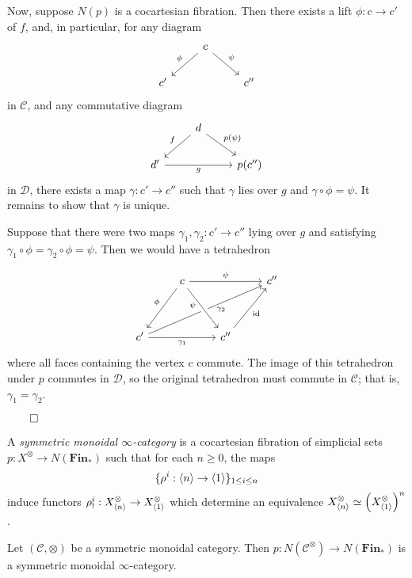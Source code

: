\documentclass{MetricNotes2023}
\def\id{\ensuremath\text{id}}
\def\done{\begin{flushright}\vspace{-4.35ex}\(\qed\)\end{flushright}}
\begin{document}
\begin{ourproof}
Now, suppose \(N(p)\) is a cocartesian fibration. Then there exists a lift \(\phi : c \to c'\) of \(f\), and, in particular, for any diagram
\[\begin{tikzcd}
& c \arrow[dl, swap, "\phi"] \arrow[dr, "\psi"]  & \\
c'  & & c''
\end{tikzcd}\]
in \(\mathcal{C}\), and any commutative diagram
\[\begin{tikzcd}
& d \arrow[dl, swap, "f"] \arrow[dr, "p(\psi)"]  & \\
d' \arrow[rr, swap, "g"] & & p(c'')
\end{tikzcd}\]
in \(\mathcal{D}\), there exists a map \(\gamma : c'\to c''\) such that \(\gamma\) lies over \(g\) and \(\gamma \circ \phi = \psi\). It remains to show that \(\gamma\) is unique. 

Suppose that there were two maps \(\gamma_1, \gamma_2 : c' \to c''\) lying over \(g\) and satisfying \(\gamma_1\circ\phi = \gamma_2 \circ \phi = \psi\). Then we would have a tetrahedron 

\[\begin{tikzcd}
& c \arrow[rr, "\psi"] \arrow[ddl, swap, "\phi"]  & & c'' \\
& & & \\
c' \arrow[rr, swap, "\gamma_1"] \arrow[rrruu, swap, "\gamma_2" {xshift=8pt, yshift=5pt}] & & c'' \arrow[ruu, swap, "\id"] \arrow[from=luu, swap, crossing over, "\psi" {xshift=-4pt, yshift=8pt}] & 
\end{tikzcd}\]
where all faces containing the vertex \(c\) commute. The image of this tetrahedron under \(p\) commutes in \(\mathcal{D}\), so the original tetrahedron must commute in \(\mathcal{C}\); that is, \(\gamma_1=\gamma_2\).\done

\begin{definition}
A \textit{symmetric monoidal \(\infty\)-category} is a cocartesian fibration of simplicial sets \(p : X^\otimes \to N(\textbf{Fin}_*)\) such that for each \(n \geq 0\), the maps 
\[\{\rho^i : \langle n\rangle\to \langle1\rangle\}_{1 \leq i \leq n}\] 
induce functors \(\rho^i_! : X^\otimes_{\langle n\rangle}\to X^\otimes_{\langle1\rangle}\) which determine an equivalence \(X^\otimes_{\langle n\rangle}\simeq \left(X^\otimes_{\langle1\rangle}\right)^n\). 
\end{definition}

\begin{example}
Let \((\mathcal{C}, \otimes)\) be a symmetric monoidal category. Then \(p : N(\mathcal{C}^\otimes) \to N(\textbf{Fin}_*)\) is a symmetric monoidal \(\infty\)-category. 
\end{example}


\end{ourproof}
\end{document}
